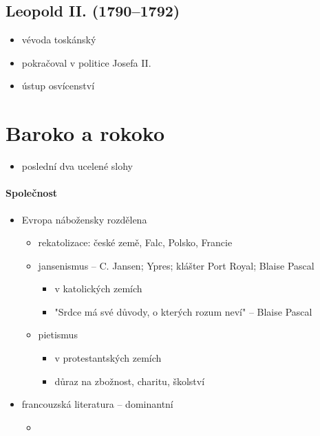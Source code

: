 \subsection{Leopold II. (1790--1792)}
\begin{itemize}
\item vévoda toskánský
\item pokračoval v politice Josefa II.
\item ústup osvícenství
\end{itemize}

\section{Baroko a rokoko}
\begin{itemize}
\item poslední dva ucelené slohy
\end{itemize}
\paragraph{Společnost}
\begin{itemize}
\item Evropa nábožensky rozdělena
	\begin{itemize}
	\item rekatolizace: české země, Falc, Polsko, Francie
	\item jansenismus -- C. Jansen; Ypres; klášter Port Royal; Blaise Pascal	
		\begin{itemize}
		\item v katolických zemích
		\item "Srdce má své důvody, o kterých rozum neví" -- Blaise Pascal
		\end{itemize}
	\item pietismus 
		\begin{itemize}
		\item v protestantských zemích
		\item důraz na zbožnost, charitu, školství
		\end{itemize}
	\end{itemize}
	\item francouzská literatura -- dominantní
		\begin{itemize}
		\item 
		\end{itemize}
\end{itemize}

